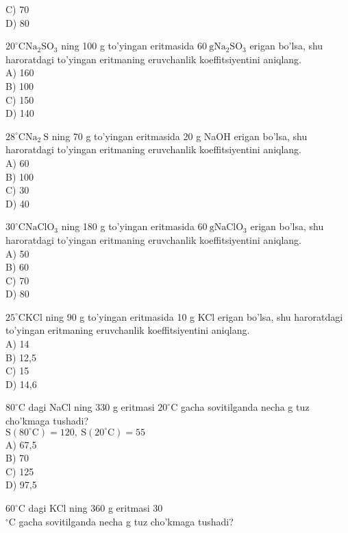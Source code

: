 C) 70\\
D) 80
  \item $20^{\circ} \mathrm{C} \mathrm{Na}_{2} \mathrm{SO}_{3}$ ning 100 g to'yingan eritmasida $60 \mathrm{~g} \mathrm{Na}_{2} \mathrm{SO}_{3}$ erigan bo'lsa, shu haroratdagi to'yingan eritmaning eruvchanlik koeffitsiyentini aniqlang.\\
A) 160\\
B) 100\\
C) 150\\
D) 140
  \item $28^{\circ} \mathrm{C} \mathrm{Na}{ }_{2} \mathrm{~S}$ ning 70 g to'yingan eritmasida 20 g NaOH erigan bo'lsa, shu haroratdagi to'yingan eritmaning eruvchanlik koeffitsiyentini aniqlang.\\
A) 60\\
B) 100\\
C) 30\\
D) 40
  \item $30^{\circ} \mathrm{C} \mathrm{NaClO}_{3}$ ning 180 g to'yingan eritmasida $60 \mathrm{~g} \mathrm{NaClO}_{3}$ erigan bo'lsa, shu haroratdagi to'yingan eritmaning eruvchanlik koeffitsiyentini aniqlang.\\
A) 50\\
B) 60\\
C) 70\\
D) 80
  \item $25^{\circ} \mathrm{C} \mathrm{KCl}$ ning 90 g to'yingan eritmasida 10 g KCl erigan bo'lsa, shu haroratdagi to'yingan eritmaning eruvchanlik koeffitsiyentini aniqlang.\\
A) 14\\
B) 12,5\\
C) 15\\
D) 14,6
  \item $80^{\circ} \mathrm{C}$ dagi NaCl ning 330 g eritmasi $20^{\circ} \mathrm{C}$ gacha sovitilganda necha g tuz cho'kmaga tushadi?\\
$\mathrm{S}\left(80^{\circ} \mathrm{C}\right)=120, \mathrm{~S}\left(20^{\circ} \mathrm{C}\right)=55$\\
A) 67,5\\
B) 70\\
C) 125\\
D) 97,5\\
  \item $60^{\circ} \mathrm{C}$ dagi KCl ning 360 g eritmasi 30\\
${ }^{\circ} \mathrm{C}$ gacha sovitilganda necha g tuz cho'kmaga tushadi?\\
